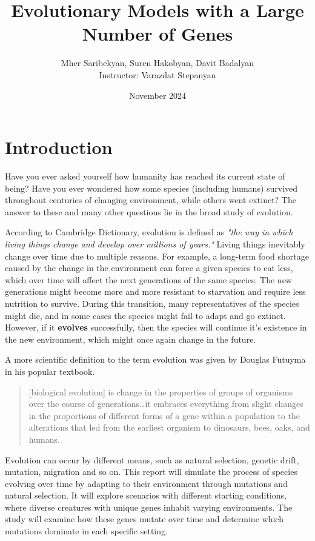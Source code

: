 \documentclass{article}
\title{Evolutionary Models with a Large Number of Genes}
\author{
    Mher Saribekyan, Suren Hakobyan, Davit Badalyan\\
    Instructor: Varazdat Stepanyan 
}
\affil{American University of Armenia}
\date{November 2024}
\begin{document}
\maketitle
\newpage
\tableofcontents
\newpage

\section{Introduction}
Have you ever asked yourself how humanity has reached its current state of being? Have you ever wondered how some species (including humans) survived throughout centuries of changing environment, while others went extinct? The answer to these and many other questions lie in the broad study of evolution. 

According to Cambridge Dictionary, evolution is defined as \textit{"the way in which living things change and develop over millions of years."} Living things inevitably change over time due to multiple reasons. For example, a long-term food shortage caused by the change in the environment can force a given species to eat less, which over time will affect the next generations of the same species. The new generations might become more and more resistant to starvation and require less nutrition to survive. During this transition, many representatives of the species might die, and in some cases the species might fail to adapt and go extinct. However, if it \textbf{evolves} successfully, then the species will continue it's existence in the new environment, which might once again change in the future. 

A more scientific definition to the term evolution was given by Douglas Futuyma in his popular textbook.

\begin{quotation}
    [biological evolution] is change in the properties of groups of organisms over the course of generations…it embraces everything from slight changes in the proportions of different forms of a gene within a population to the alterations that led from the earliest organism to dinosaurs, bees, oaks, and humans.
\end{quotation}

Evolution can occur by different means, such as natural selection, genetic drift, mutation, migration and so on. This report will simulate the process of species evolving over time by adapting to their environment through mutations and natural selection. It will explore scenarios with different starting conditions, where diverse creatures with unique genes inhabit varying environments. The study will examine how these genes mutate over time and determine which mutations dominate in each specific setting.
\newpage
\end{document}
